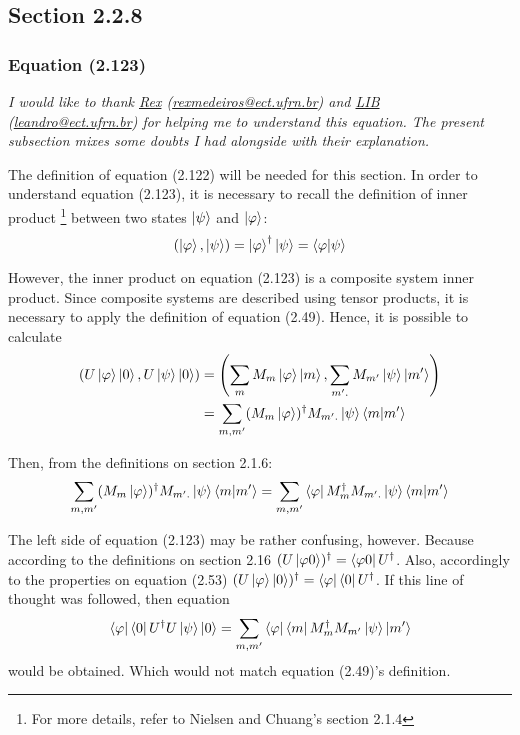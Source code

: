 \subsection{Section 2.2.8}
\subsubsection{Equation (2.123)}

\emph{I would like to thank
    \href{http://buscatextual.cnpq.br/buscatextual/visualizacv.do?id=K4774458A4}{Rex}
    (\href{mailto:rexmedeiros@ect.ufrn.br}{rexmedeiros@ect.ufrn.br})
    and
    \href{http://buscatextual.cnpq.br/buscatextual/visualizacv.do?id=K4733964Y9&idiomaExibicao=2}{LIB} 
    (\href{mailto:leandro@ect.ufrn.br}{leandro@ect.ufrn.br})
    for helping me to understand this equation. The present subsection mixes some doubts I had alongside with their explanation.
}

The definition of equation (2.122) will be needed for this section. In order to understand equation (2.123), it is necessary to recall the definition of inner product \footnote{For more details, refer to Nielsen and Chuang's section 2.1.4} between two states $\ket{\psi}$ and $\ket{\varphi}$:
%
\[
(\ket{\varphi}, \ket{\psi}) = \ket{\varphi}^\dagger \ket{\psi} = \mathop{\mathinner{ \langle{\varphi}|{\psi}\rangle}}
\]

However, the inner product on equation (2.123) is a composite system inner product. Since composite systems are described using tensor products, it is necessary to apply the definition of equation (2.49). Hence, it is possible to calculate
%
\begin{align}
    \left( U \ket{\varphi} \ket{0}, U \ket{\psi} \ket{0} \right) &= 
    \left( \sum_m M_m \ket{\varphi} \ket{m} , \sum_{m'.} M_{m'} \ket{\psi} \ket{m'} \right)
    \\
    &= \sum_{m, m'} (M_m\ket{\varphi})^\dagger M_{m'.}\ket{\psi} \mathop{\mathinner{ \langle{m}|{m'}\rangle}}
\end{align}

Then, from the definitions on section 2.1.6:
\begin{align}
    \sum_{m, m'} (M_m\ket{\varphi})^\dagger M_{m'.}\ket{\psi} \mathop{\mathinner{ \langle{m}|{m'}\rangle}} =
    \sum_{m, m'} \bra{\varphi} M_m^\dagger M_{m'.}\ket{\psi} \mathop{\mathinner{ \langle{m}|{m'}\rangle}}
\end{align}

The left side of equation (2.123) may be rather confusing, however. Because according to the definitions on section 2.16 $(U \ket{\varphi 0})^\dagger = \bra{\varphi 0} U^\dagger$. Also, accordingly to the properties on equation (2.53)  $(U \ket{\varphi} \ket{0})^\dagger = \bra{\varphi} \bra{0} U^\dagger$. If this line of thought was followed, then equation
%
\[
\bra{\varphi} \bra{0} U^\dagger U \ket{\psi} \ket{0} =
\sum_{m,m'} \bra{\varphi}\bra{m} M^\dagger_m M_{m'} \ket{\psi} \ket{m'}
\]
%
would be obtained. Which would not match equation (2.49)'s definition.

